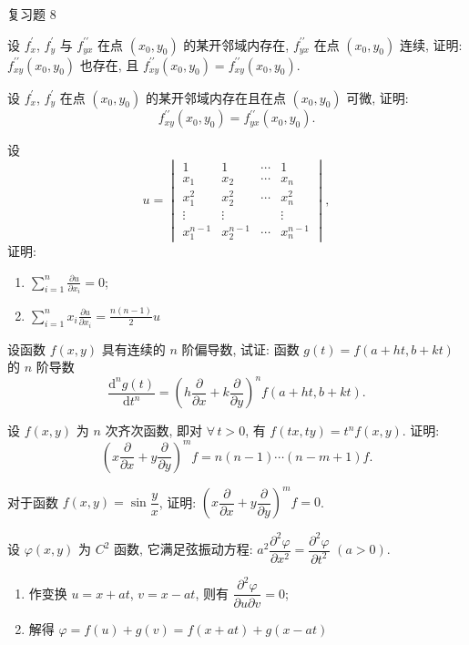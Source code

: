 \begin{exblock}{复习题 8}
\item 设 $f_{x}^{\prime}$, $f_{y}^{\prime}$ 与 $f_{yx}^{\prime\prime}$ 在点 $(x_{0}, y_{0})$ 的某开邻域内存在, $f_{yx}^{\prime\prime}$ 在点 $(x_{0}, y_{0})$ 连续, 证明: $f_{xy}^{\prime\prime}(x_{0}, y_{0})$ 也存在, 且 $f_{xy}^{\prime\prime}(x_{0}, y_{0}) = f_{xy}^{\prime\prime}(x_{0}, y_{0})$.

\item 设 $f_{x}^{\prime}$, $f_{y}^{\prime}$ 在点 $(x_{0}, y_{0})$ 的某开邻域内存在且在点 $(x_{0}, y_{0})$ 可微, 证明:
\[
  f_{xy}^{\prime\prime}(x_{0}, y_{0}) = f_{yx}^{\prime\prime}(x_{0}, y_{0}).
\]

\item 设
\[
  u = \begin{vmatrix}
    1 & 1 & \cdots & 1 \\
    x_{1} & x_{2} & \cdots & x_{n} \\
    x_{1}^{2} & x_{2}^{2} & \cdots & x_{n}^{2} \\
    \vdots & \vdots & & \vdots \\
    x_{1}^{n-1} & x_{2}^{n-1} & \cdots & x_{n}^{n-1}
  \end{vmatrix},
\]
证明:
\begin{enumerate}
  \item[(1)] $\displaystyle\sum_{i=1}^{n}\frac{\partial u}{\partial x_{i}} = 0$;
  \item[(2)] $\displaystyle\sum_{i=1}^{n}x_{i}\frac{\partial u}{\partial x_{i}} = \frac{n(n-1)}{2}u$
\end{enumerate}

\item 设函数 $f(x,y)$ 具有连续的 $n$ 阶偏导数, 试证: 函数 $g(t) = f(a + ht, b + kt)$ 的 $n$ 阶导数
\[
  \frac{\mathrm{d}^{n}g(t)}{\mathrm{d}t^{n}} = \left(h\frac{\partial}{\partial x} + k\frac{\partial}{\partial y}\right)^{n}f(a + ht, b + kt).
\]

\item 设 $f(x,y)$ 为 $n$ 次齐次函数, 即对 $\forall\,t > 0$, 有 $f(tx, ty) = t^{n}f(x,y)$. 证明:
\[
  \left(x\frac{\partial}{\partial x} + y\frac{\partial}{\partial y}\right)^{m}f = n(n-1)\cdots(n-m+1)f.
\]

\item 对于函数 $f(x,y) = \sin\dfrac{y}{x}$, 证明: $\left(x\dfrac{\partial}{\partial x} + y\dfrac{\partial}{\partial y}\right)^{m}f = 0$.

\item 设 $\varphi(x,y)$ 为 $C^{2}$ 函数, 它满足弦振动方程: $a^{2}\dfrac{\partial^{2}\varphi}{\partial x^{2}} = \dfrac{\partial^{2}\varphi}{\partial t^{2}}$ $(a > 0)$.
\begin{enumerate}
  \item[(1)] 作变换 $u = x + at$, $v = x - at$, 则有 $\dfrac{\partial^{2}\varphi}{\partial u \partial v} = 0$;
  \item[(2)] 解得 $\varphi = f(u) + g(v) = f(x + at) + g(x - at)$
\end{enumerate}


\end{exblock}
